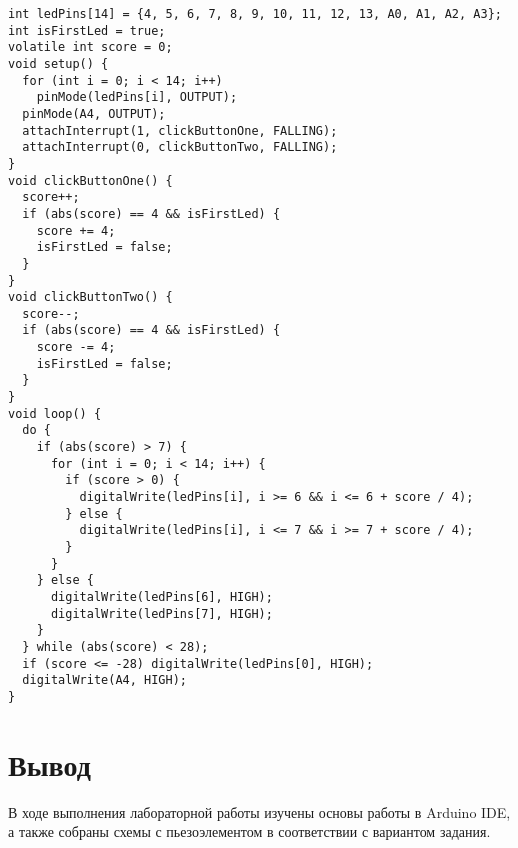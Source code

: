 \documentclass[a4paper,14pt]{extarticle}
\begin{document}
  \begingroup
    \fontsize{14pt}{10pt}\selectfont
    \linespread{1}
    \begin{verbatim}
int ledPins[14] = {4, 5, 6, 7, 8, 9, 10, 11, 12, 13, A0, A1, A2, A3};
int isFirstLed = true;
volatile int score = 0;
void setup() {
  for (int i = 0; i < 14; i++)
    pinMode(ledPins[i], OUTPUT);
  pinMode(A4, OUTPUT);
  attachInterrupt(1, clickButtonOne, FALLING);
  attachInterrupt(0, clickButtonTwo, FALLING);
}
void clickButtonOne() {
  score++;
  if (abs(score) == 4 && isFirstLed) {
    score += 4;
    isFirstLed = false;
  }
}
void clickButtonTwo() {
  score--;
  if (abs(score) == 4 && isFirstLed) {
    score -= 4;
    isFirstLed = false;
  }
}
void loop() {
  do {
    if (abs(score) > 7) {
      for (int i = 0; i < 14; i++) {
        if (score > 0) {
          digitalWrite(ledPins[i], i >= 6 && i <= 6 + score / 4);
        } else {
          digitalWrite(ledPins[i], i <= 7 && i >= 7 + score / 4);
        }
      }
    } else {
      digitalWrite(ledPins[6], HIGH);
      digitalWrite(ledPins[7], HIGH);
    }
  } while (abs(score) < 28);
  if (score <= -28) digitalWrite(ledPins[0], HIGH);
  digitalWrite(A4, HIGH);
}
    \end{verbatim}
  \endgroup

  \section*{\hspace{12.5mm}Вывод}
  В ходе выполнения лабораторной работы изучены основы работы в Arduino IDE, а также собраны схемы с пьезоэлементом в соответствии с вариантом задания.
\end{document}
